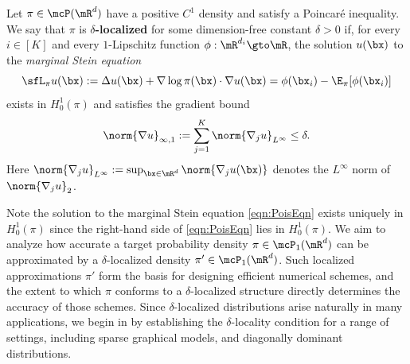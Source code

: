\documentclass[11pt]{article}
\begin{document}
\begin{defn}
\label{def:PoisGrad}
Let $\pi \in \mcP(\mR^d)$ have a positive $C^1$ density and satisfy a Poincar\'e inequality.
We say that $\pi$ is {\bf $\delta$-localized} for some dimension-free constant $\delta>0$ if, for every $i\in[K]$ and every $1$-Lipschitz function $\phi : \mR^{d_i} \gto \mR$, the solution $u(\bx)$ to the \emph{marginal Stein equation}
\begin{equation}
\label{eqn:PoisEqn}
    \sfL_\pi u (\bx) := \Delta u(\bx) + \nabla \log \pi(\bx) \cdot \nabla u(\bx) = \phi(\bx_i) - \E_\pi [\phi(\bx_i)]
\end{equation}
exists in $H_0^1(\pi)$ and satisfies the gradient bound
\begin{equation}
\label{eqn:PoisGradBound}
    \norm{ \nabla u }_{\infty,1} := \sum_{j=1}^K \norm{ \nabla_j u }_{L^\infty} \le \delta.
\end{equation}
Here $\norm{ \nabla_j u }_{L^\infty} := \sup_{\bx\in\mR^d} \norm{ \nabla_j u(\bx) }$ denotes the $L^\infty$ norm of $\norm{\nabla_j u}_2$.
\end{defn}


Note the solution to the marginal Stein equation \eqref{eqn:PoisEqn} exists uniquely in $H_0^1(\pi)$ since the right-hand side of \eqref{eqn:PoisEqn} lies in $H_0^1(\pi)$.
We aim to analyze how accurate a target probability density  $\pi \in  \mcP_1(\mR^d)$ can be approximated by a $\delta$-localized density $\pi' \in  \mcP_1(\mR^d)$. Such localized approximations $\pi'$ form the basis for designing efficient numerical schemes, and the extent to which $\pi$ conforms to a $\delta$-localized structure directly determines the accuracy of those schemes. Since $\delta$-localized distributions arise naturally in many applications, we begin in  by establishing the $\delta$-locality condition for a range of settings, including sparse graphical models, and diagonally dominant distributions.
%
\end{document}
